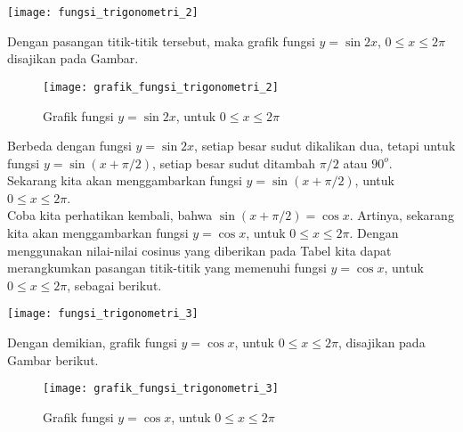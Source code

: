 \documentclass[11pt,fleqn]{book} %
\begin{document}
\begin{myEnumerate}
\begin{itemize}
\begin{enumerate}
\begin{example}
\texttt{[image: fungsi\_trigonometri\_2]}

Dengan  pasangan titik-titik tersebut, maka grafik fungsi $y = \sin 2x$, $0 \leq x\leq 2\pi$ disajikan pada Gambar.\\

\begin{figure}[!ht]
\begin{center}
\texttt{[image: grafik\_fungsi\_trigonometri\_2]} 
\caption{Grafik fungsi $y = \sin 2x$, untuk $0 \leq x\leq 2\pi$}
\end{center}
\end{figure}

Berbeda dengan fungsi $y = \sin 2x$, setiap besar sudut dikalikan dua, tetapi untuk fungsi $y = \sin(x+\pi/2)$, setiap besar sudut ditambah $\pi/2$ atau $90^o$.\\
Sekarang kita akan menggambarkan fungsi $y = \sin(x+\pi/2)$, untuk $0 \leq x\leq 2\pi$.\\
Coba kita perhatikan kembali, bahwa $\sin(x+\pi/2) = \cos x$. Artinya, sekarang kita akan menggambarkan fungsi $y = \cos x$, untuk $0 \leq x\leq 2\pi$. Dengan menggunakan nilai-nilai cosinus yang diberikan pada Tabel kita dapat merangkumkan pasangan titik-titik  yang memenuhi fungsi $y = \cos x$, untuk $0 \leq x\leq 2\pi$, sebagai berikut.

\texttt{[image: fungsi\_trigonometri\_3]}

Dengan demikian, grafik fungsi $y = \cos x$, untuk $0 \leq x\leq 2\pi$, disajikan pada Gambar berikut.\\

\begin{figure}[!ht]
\begin{center}
\texttt{[image: grafik\_fungsi\_trigonometri\_3]} 
\caption{Grafik fungsi $y = \cos x$, untuk $0 \leq x\leq 2\pi$}
\end{center}
\end{figure}


\end{example}
\end{enumerate}
\end{itemize}
\end{myEnumerate}
\end{document}
